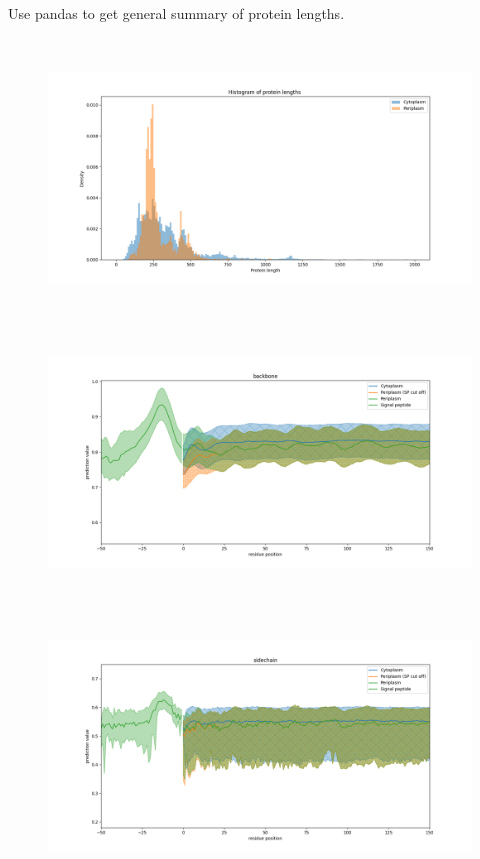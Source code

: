 Use pandas to get general summary of protein lengths.

~\begin{figure}[h!]
	\includegraphics[width=\linewidth]
	{./results/general_comparison/img/protein_length.png}
~\end{figure}

~\begin{figure}[h!]
	\includegraphics[width=\linewidth]
	{./results/general_comparison/img/backbone.png}
~\end{figure}

~\begin{figure}[h!]
	\includegraphics[width=\linewidth]
	{./results/general_comparison/img/sidechain.png}
~\end{figure}

